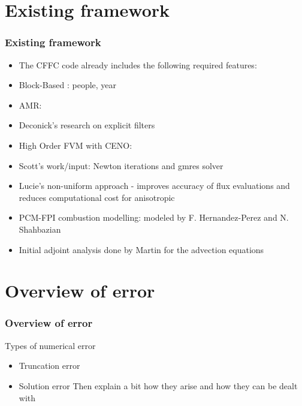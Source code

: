 \documentclass{beamer}
\begin{document}
\section[Framework]{Existing framework}
\begin{frame}%
\scriptsize
\frametitle{Existing framework}
\begin{itemize}
\item The CFFC code already includes the following required features:
\item Block-Based : people, year
\item AMR:
\item Deconick's research on explicit filters
\item High Order FVM with CENO:
\item Scott's work/input: Newton iterations and gmres solver
\item Lucie's non-uniform approach - improves accuracy of flux evaluations and reduces computational cost for anisotropic
\item PCM-FPI combustion modelling: modeled by F. Hernandez-Perez and N. Shahbazian
\item Initial adjoint analysis done by Martin for the advection equations
\end{itemize}
\end{frame}



\section[Error]{Overview of error}
\begin{frame}%
\frametitle{Overview of error}
\scriptsize
Types of numerical error
\begin{itemize}
\item Truncation error
\item Solution error
Then explain a bit how they arise and how they can be dealt with
\end{itemize}
\end{frame}


\end{document}
